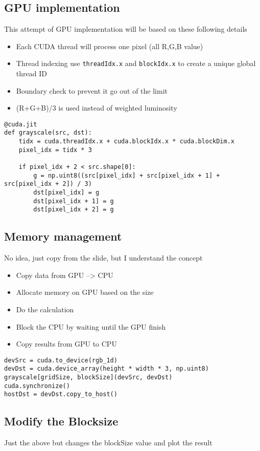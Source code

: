 \documentclass[12pt,a4paper]{cibb}
\begin{document}
\subsection{GPU implementation}
This attempt of GPU implementation will be based on these following details
\begin{itemize}
    \item Each CUDA thread will process one pixel (all R,G,B value)
    \item Thread indexing use \verb|threadIdx.x| and \verb|blockIdx.x| to create a unique global thread ID
    \item Boundary check to prevent it go out of the limit
    \item (R+G+B)/3 is used instead of weighted luminosity
\end{itemize}
\begin{lstlisting}
@cuda.jit
def grayscale(src, dst):
    tidx = cuda.threadIdx.x + cuda.blockIdx.x * cuda.blockDim.x
    pixel_idx = tidx * 3
    
    if pixel_idx + 2 < src.shape[0]:
        g = np.uint8((src[pixel_idx] + src[pixel_idx + 1] + src[pixel_idx + 2]) / 3)
        dst[pixel_idx] = g
        dst[pixel_idx + 1] = g
        dst[pixel_idx + 2] = g
\end{lstlisting}


\subsection{Memory management}
No idea, just copy from the slide, but I understand the concept
\begin{itemize}
    \item Copy data from GPU --> CPU
    \item Allocate memory on GPU based on the size
    \item Do the calculation
    \item Block the CPU by waiting until the GPU finish
    \item Copy results from GPU to CPU
\end{itemize}
\begin{lstlisting}
devSrc = cuda.to_device(rgb_1d)
devDst = cuda.device_array(height * width * 3, np.uint8)
grayscale[gridSize, blockSize](devSrc, devDst)
cuda.synchronize()
hostDst = devDst.copy_to_host()
\end{lstlisting}

\subsection{Modify the Blocksize}
Just the above but changes the blockSize value and plot the result
\end{document}
